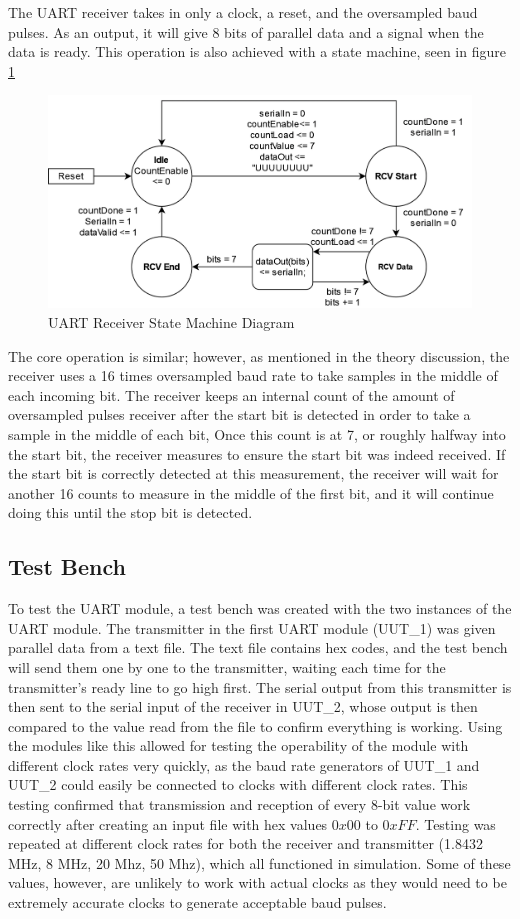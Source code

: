 \documentclass[11pt]{article}
\begin{document}
The UART receiver takes in only a clock, a reset, and the oversampled baud pulses.
As an output, it will give 8 bits of parallel data and a signal when the data is ready.
This operation is also achieved with a state machine, seen in figure \ref{fig:receivesm}

\begin{figure}[H]        
    \centering
    \includegraphics[width=.66\textwidth]{ReceiverSM.drawio.png}
    \caption{UART Receiver State Machine Diagram}
    \label{fig:receivesm}
\end{figure} 

The core operation is similar; however, as mentioned in the theory discussion, the receiver uses a 16 times oversampled baud rate to take samples in the middle of each incoming bit.
The receiver keeps an internal count of the amount of oversampled pulses receiver after the start bit is detected in order to take a sample in the middle of each bit,
Once this count is at 7, or roughly halfway into the start bit, the receiver measures to ensure the start bit was indeed received.
If the start bit is correctly detected at this measurement, the receiver will wait for another 16 counts to measure in the middle of the first bit, and it will continue doing this until the stop bit is detected.

\subsection{Test Bench}
To test the UART module, a test bench was created with the two instances of the UART module.
The transmitter in the first UART module (UUT\_1) was given parallel data from a text file.
The text file contains hex codes, and the test bench will send them one by one to the transmitter, waiting each time for the transmitter's ready line to go high first.
The serial output from this transmitter is then sent to the serial input of the receiver in UUT\_2, whose output is then compared to the value read from the file to confirm everything is working.
Using the modules like this allowed for testing the operability of the module with different clock rates very quickly, as the baud rate generators of UUT\_1 and UUT\_2 could easily be connected to clocks with different clock rates. 
This testing confirmed that transmission and reception of every 8-bit value work correctly after creating an input file with hex values $0x00$ to $0xFF$. 
Testing was repeated at different clock rates for both the receiver and transmitter (1.8432 MHz, 8 MHz, 20 Mhz, 50 Mhz), which all functioned in simulation.
Some of these values, however, are unlikely to work with actual clocks as they would need to be extremely accurate clocks to generate acceptable baud pulses. 
\end{document}
